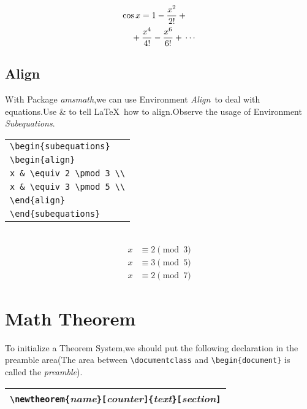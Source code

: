\documentclass[a4paper]{report}
\begin{document}
\begin{eqnarray}
\lefteqn{ \cos x = 1 -\frac{x^{2}}{2!} +{} }
\nonumber\\
& & {}+\frac{x^{4}}{4!} -\frac{x^{6}}{6!}+{}\cdots
\end{eqnarray}

\subsection{Align}\label{Align}
With Package \emph{amsmath},we can use Environment \emph{Align}\ to
deal with equations.Use \& to tell \LaTeX\ how to align.Observe the
usage of Environment \emph{Subequations}.

\begin{tabular}{|l|}
\hline
\verb|\begin{subequations}|\\
\verb|\begin{align}|\\
\verb|x & \equiv 2 \pmod 3 \\|\\
\verb|x & \equiv 3 \pmod 5 \\|\\
\verb|\end{align}|\\
\verb|\end{subequations}|\\
\hline
\end{tabular}\\

\begin{subequations}
\begin{align}
x & \equiv 2 \pmod 3 \\
x & \equiv 3 \pmod 5 \\
x & \equiv 2 \pmod 7
\end{align}
\end{subequations}

\section{Math Theorem}
To initialize a Theorem System,we should put the following
declaration in the preamble area(The area between
\verb|\documentclass| and \verb|\begin{document}| is called the
\emph{preamble}).\\

\begin{tabular}{|l|}
\hline
\verb|\newtheorem{|\emph{name}\verb|}[|\emph{counter}\verb|]{|\emph{text}\verb|}[|\emph{section}\verb|]|\\
\hline
\end{tabular}\\
\end{document}
